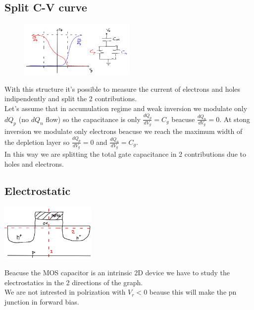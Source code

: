 \subsection{Split C-V curve}
\begin{figure}
\includegraphics[width=0.5\textwidth]{splitcv.png}
\end{figure}
With this structure it's possible to measure the current of electrons and holes indipendently and split the 2 contributions.\\
Let's assume that in accumulation regime and weak inversion we modulate only $dQ_p$ (no $dQ_n$ flow) so the capacitance is only $\frac{dQ_p}{dV_g}=C_g$ beacuse $\frac{dQ_n}{dV_g}=0$.
At stong inversion we modulate only electrons beacuse we reach the maximum width of the depletion layer so $\frac{dQ_p}{dV_g}=0$ and $\frac{dQ_n}{dV_g}=C_g$.\\ In this way we are splitting the total gate capacitance in 2 contributions due to holes and electrons.\\


\subsection{Electrostatic}
\centering
\includegraphics[width=0.35\textwidth]{sections.png}\\
\raggedright

Beacuse the MOS capacitor is an intrinsic 2D device we have to study the electrostatics in the 2 directions of the graph. \\ 
We are not intrested in polrization with $V_r<0$ beause this will make the pn junction in forward bias.\\



